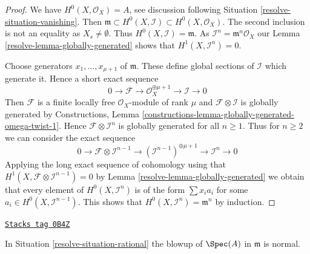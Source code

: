 \begin{proof}

We have $H^0(X, \mathcal{O}_X) = A$, see discussion following
Situation \ref{resolve-situation-vanishing}. Then
$\mathfrak m \subset H^0(X, \mathcal{I}) \subset H^0(X, \mathcal{O}_X)$.
The second inclusion is not an equality as $X_s \not = \emptyset$.
Thus $H^0(X, \mathcal{I}) = \mathfrak m$.
As $\mathcal{I}^n = \mathfrak m^n\mathcal{O}_X$ our
Lemma \ref{resolve-lemma-globally-generated} shows that $H^1(X, \mathcal{I}^n) = 0$.

\medskip\noindent
Choose generators $x_1, \ldots, x_{\mu + 1}$ of $\mathfrak m$. These define
global sections of $\mathcal{I}$ which generate it. Hence
a short exact sequence
$$
0 \to \mathcal{F} \to \mathcal{O}_X^{\oplus \mu + 1} \to \mathcal{I} \to 0
$$
Then $\mathcal{F}$ is a finite locally free $\mathcal{O}_X$-module
of rank $\mu$ and $\mathcal{F} \otimes \mathcal{I}$ is globally
generated by Constructions, Lemma
\ref{constructions-lemma-globally-generated-omega-twist-1}.
Hence $\mathcal{F} \otimes \mathcal{I}^n$
is globally generated for all $n \geq 1$. Thus for $n \geq 2$ we can
consider the exact sequence
$$
0 \to \mathcal{F} \otimes \mathcal{I}^{n - 1} \to
(\mathcal{I}^{n - 1})^{\oplus \mu + 1} \to
\mathcal{I}^n \to 0
$$
Applying the long exact sequence of cohomology using that
$H^1(X, \mathcal{F} \otimes \mathcal{I}^{n - 1}) = 0$ by
Lemma \ref{resolve-lemma-globally-generated}
we obtain that every
element of $H^0(X, \mathcal{I}^n)$ is of the form $\sum x_i a_i$
for some $a_i \in H^0(X, \mathcal{I}^{n - 1})$. This shows that
$H^0(X, \mathcal{I}^n) = \mathfrak m^n$ by induction.
\end{proof}

\begin{lemma}
\label{resolve-lemma-blow-up-normal-rational}
\href{https://stacks.math.columbia.edu/tag/0B4Z}{\texttt{Stacks tag 0B4Z}}

In Situation \ref{resolve-situation-rational}
the blowup of $\Spec(A)$ in $\mathfrak m$ is normal.
\end{lemma}

